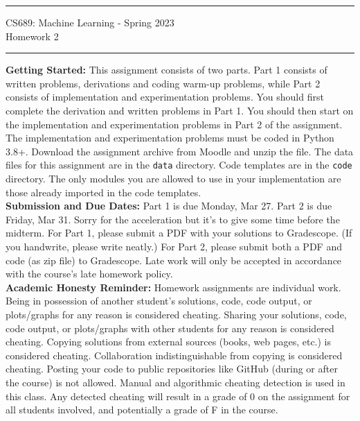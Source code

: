 \documentclass[11pt]{article}
\begin{document}
{\centering
  \rule{6.3in}{2pt}
  \vspace{1em}
  {\Large
    CS689: Machine Learning - Spring 2023 \\
    Homework 2\\
  }
  \vspace{1em}

  \vspace{0.1em}
  \rule{6.3in}{1.5pt}
}
\vspace{1pc}


\textbf{Getting Started:} This assignment consists of two parts. Part 1 consists of written problems, derivations and coding warm-up problems, while Part 2 consists of implementation and experimentation problems. You should first complete the derivation and written problems in Part 1. You should then start on the implementation and experimentation problems in Part 2 of the assignment. The implementation and experimentation problems must be coded in Python 3.8+. Download the assignment archive from Moodle and unzip the file. The data files for this assignment are in the \verb|data| directory. Code templates are in the \verb|code| directory. The only modules you are allowed to use in your implementation are those already imported in the code templates.\\

\textbf{Submission and Due Dates:} Part 1 is due Monday, Mar 27.  Part 2 is due Friday, Mar 31.  Sorry for the acceleration but it's to give some time before the midterm.
For Part 1, please submit a PDF with your solutions to Gradescope.
(If you handwrite, please write neatly.)
For Part 2, please submit both a PDF and code (as zip file) to Gradescope.
Late work will only be accepted in accordance with the course's late homework policy.\\

\textbf{Academic Honesty Reminder:} Homework assignments are individual work. Being in possession of another student's solutions, code, code output, or plots/graphs for any reason is considered cheating. Sharing your solutions, code, code output, or plots/graphs with other students for any reason is considered cheating. Copying solutions from external sources (books, web pages, etc.) is considered cheating. Collaboration indistinguishable from copying is considered cheating. Posting your code to public repositories like GitHub (during or after the course) is not allowed.  Manual and algorithmic cheating detection is used in this class. Any detected cheating will result in a grade of 0 on the assignment for all students involved, and potentially a grade of F in the course. 
\\
\end{document}
